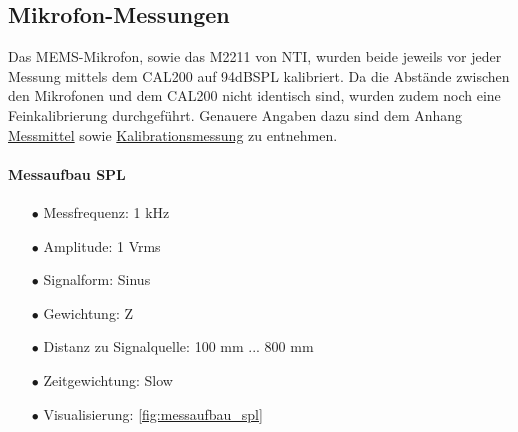 \documentclass[12pt]{article}
\begin{document}
	\subsection{Mikrofon-Messungen} \label{Mikrofon-Messungen}
	Das MEMS-Mikrofon, sowie das M2211 von NTI, wurden beide jeweils vor jeder Messung mittels dem CAL200 auf 94dBSPL kalibriert. Da die Abstände zwischen den Mikrofonen und dem CAL200 nicht identisch sind, wurden zudem noch eine Feinkalibrierung durchgeführt. Genauere Angaben dazu sind dem Anhang \hyperref[Messmittel]{Messmittel} sowie \hyperref[Kalibrationsmessung]{Kalibrationsmessung} zu entnehmen.
	\paragraph{Messaufbau SPL}
		\begin{itemize}[topsep=10pt,partopsep=0pt,labelwidth=5cm,align=left,itemindent=5cm]
		\item[$\bullet$ Messfrequenz:] 1 kHz
		\item[$\bullet$ Amplitude:]  1 Vrms
		\item[$\bullet$ Signalform:]  Sinus
		\item[$\bullet$ Gewichtung:]  Z
		\item[$\bullet$ Distanz zu Signalquelle:]  100 mm ... 800 mm
		\item[$\bullet$ Zeitgewichtung:]  Slow
		\item[$\bullet$ Visualisierung:]  \ref{fig:messaufbau_spl}
	\end{itemize}
\end{document}
